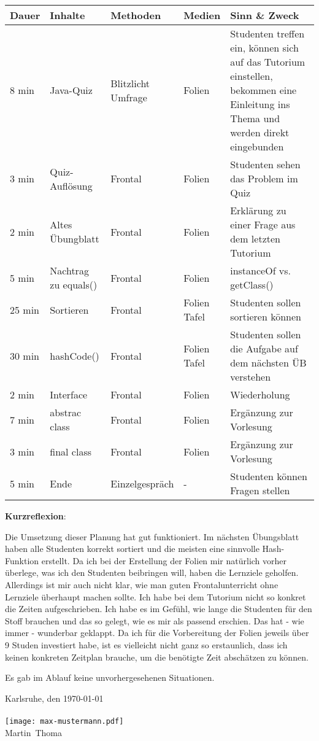 \documentclass[a4paper,12pt]{article}
\newcommand{\Datum}{\today}             %
\newcommand{\Ort}{Karlsruhe}
\newcommand{\Vorname}{Martin}
\newcommand{\Nachname}{Thoma}
\begin{document}
\begin{tabularx}{\textwidth}{@{}llllX}
Dauer   & Inhalte        & Methoden            & Medien  & Sinn \& Zweck\\
\hline
8 min   & Java-Quiz      & \parbox[t]{2cm}{Blitzlicht\\Umfrage} & Folien  & Studenten treffen ein, können sich auf das Tutorium einstellen, bekommen eine Einleitung ins Thema und werden direkt eingebunden\\
3 min   & Quiz-Auflösung & Frontal  & Folien    & Studenten sehen das Problem im Quiz\\
2 min   & Altes Übungblatt & Frontal& Folien    & Erklärung zu einer Frage aus dem letzten Tutorium\\
5 min   & Nachtrag zu equals() &Frontal & Folien& instanceOf vs. getClass()\\
25 min  & Sortieren      & Frontal  & \parbox[t]{2cm}{Folien\\Tafel}    & Studenten sollen sortieren können\\
30 min  & hashCode()     & Frontal  & \parbox[t]{2cm}{Folien\\Tafel}    & Studenten sollen die Aufgabe auf dem nächsten ÜB verstehen\\
 2 min  & Interface      & Frontal  & Folien    & Wiederholung\\
 7 min  & abstrac class  & Frontal  & Folien    & Ergänzung zur Vorlesung\\
 3 min  & final class    & Frontal  & Folien    & Ergänzung zur Vorlesung\\
 5 min  & Ende           & Einzelgespräch  & -  & Studenten können Fragen stellen\\
\end{tabularx}

\textbf{Kurzreflexion}:

Die Umsetzung dieser Planung hat gut funktioniert. Im nächsten
Übungsblatt haben alle Studenten korrekt sortiert und die meisten
eine sinnvolle Hash-Funktion erstellt. Da ich bei der Erstellung der
Folien mir natürlich vorher überlege, was ich den Studenten beibringen
will, haben die Lernziele geholfen. Allerdings ist mir auch
nicht klar, wie man guten Frontalunterricht ohne Lernziele überhaupt
machen sollte.
Ich habe bei dem Tutorium nicht so konkret die Zeiten aufgeschrieben.
Ich habe es im Gefühl, wie lange die Studenten für den Stoff brauchen
und das so gelegt, wie es mir als passend erschien. Das hat - wie immer -
wunderbar geklappt. Da ich für die Vorbereitung der Folien jeweils
über 9 Studen investiert habe, ist es vielleicht nicht ganz so erstaunlich,
dass ich keinen konkreten Zeitplan brauche, um die benötigte Zeit
abschätzen zu können.

Es gab im Ablauf keine unvorhergesehenen Situationen.

\noindent \Ort, den \Datum\\
\\
\texttt{[image: max-mustermann.pdf]}\\
\Vorname~\Nachname
\end{document}
